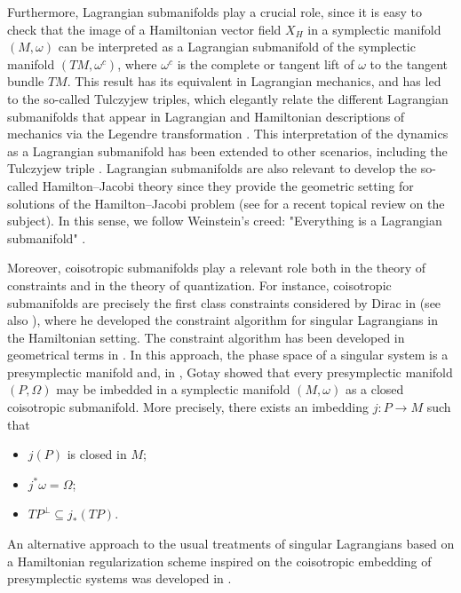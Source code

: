 \documentclass[12pt]{article}
\begin{document}

Furthermore, Lagrangian submanifolds play a crucial role, since it is easy to check that the image of a Hamiltonian vector field $X_H$ in a symplectic manifold $(M, \omega)$ can be interpreted as a Lagrangian submanifold of the symplectic manifold $(TM, \omega^c)$, where $\omega^c$ is the complete or tangent lift of $\omega$ to the tangent bundle $TM$. This result has its equivalent in Lagrangian mechanics, and has led to the so-called Tulczyjew triples, which elegantly relate the different Lagrangian submanifolds that appear in Lagrangian and Hamiltonian descriptions of mechanics via the Legendre transformation \cites{tulczyjew1976hamiltonienne,tulczyjew1976lagrangienne,de2011methods}. This interpretation of the dynamics as a Lagrangian submanifold has been extended to other scenarios, including the Tulczyjew triple \cites{deleon2003tulczyjews,jcelisa,ogul,ogul2,grabowska,ogul2021,silvia,willett}. Lagrangian submanifolds are also relevant to develop the so-called Hamilton--Jacobi theory since they provide the geometric setting for solutions of the Hamilton--Jacobi problem (see \cites{ogulin} for a recent topical review on the subject).
In this sense, we follow Weinstein's creed: "Everything is a Lagrangian submanifold" \cites{weinsteincreed}.

Moreover, coisotropic submanifolds play a relevant role both in the theory of constraints and in the theory of quantization. For instance, coisotropic submanifolds are precisely the first class constraints considered by Dirac in \cite{Dirac_1950} (see also \cites{BOJOWALD_2003}), where he developed the constraint algorithm for singular Lagrangians in the Hamiltonian setting. The constraint algorithm has been developed in geometrical terms in \cites{GotaySingularLagrangians1, GotaySinguarLagrangians2}. In this approach, the phase space of a singular system is a presymplectic manifold and, in \cite{got}, Gotay showed that every presymplectic manifold $(P, \Omega)$ may be imbedded in a symplectic manifold $(M, \omega)$ as a closed coisotropic submanifold. More precisely, there exists an imbedding $j: P \rightarrow M$ such that 
\begin{itemize}
\item $j(P)$ is closed in $M$;
\item $j^\ast \omega = \Omega$;
\item $TP^{\perp} \subseteq j_\ast (TP) $.
\end{itemize}
An alternative approach to the usual treatments of singular Lagrangians based on a Hamiltonian regularization scheme inspired on the coisotropic embedding of presymplectic systems was developed in \cites{regular}.
\end{document}
